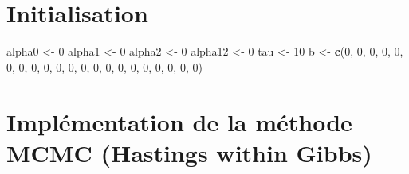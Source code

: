 \documentclass[
]{article}
\newenvironment{Shaded}{\begin{snugshade}}{\end{snugshade}}
\newcommand{\DecValTok}[1]{\textcolor[rgb]{0.00,0.00,0.81}{#1}}
\newcommand{\FunctionTok}[1]{\textcolor[rgb]{0.13,0.29,0.53}{\textbf{#1}}}
\newcommand{\NormalTok}[1]{#1}
\newcommand{\OtherTok}[1]{\textcolor[rgb]{0.56,0.35,0.01}{#1}}
\begin{document}
\hypertarget{initialisation}{%
\section{Initialisation}\label{initialisation}}

\begin{Shaded}
\begin{Highlighting}[]
\NormalTok{alpha0 }\OtherTok{\textless{}{-}} \DecValTok{0}
\NormalTok{alpha1 }\OtherTok{\textless{}{-}} \DecValTok{0}
\NormalTok{alpha2 }\OtherTok{\textless{}{-}} \DecValTok{0}
\NormalTok{alpha12 }\OtherTok{\textless{}{-}} \DecValTok{0}
\NormalTok{tau }\OtherTok{\textless{}{-}} \DecValTok{10}
\NormalTok{b }\OtherTok{\textless{}{-}} \FunctionTok{c}\NormalTok{(}\DecValTok{0}\NormalTok{, }\DecValTok{0}\NormalTok{, }\DecValTok{0}\NormalTok{, }\DecValTok{0}\NormalTok{, }\DecValTok{0}\NormalTok{, }\DecValTok{0}\NormalTok{, }\DecValTok{0}\NormalTok{, }\DecValTok{0}\NormalTok{, }\DecValTok{0}\NormalTok{, }\DecValTok{0}\NormalTok{, }\DecValTok{0}\NormalTok{, }\DecValTok{0}\NormalTok{, }\DecValTok{0}\NormalTok{, }\DecValTok{0}\NormalTok{, }\DecValTok{0}\NormalTok{, }\DecValTok{0}\NormalTok{, }\DecValTok{0}\NormalTok{, }\DecValTok{0}\NormalTok{, }\DecValTok{0}\NormalTok{, }\DecValTok{0}\NormalTok{, }\DecValTok{0}\NormalTok{)}
\end{Highlighting}
\end{Shaded}

\hypertarget{impluxe9mentation-de-la-muxe9thode-mcmc-hastings-within-gibbs}{%
\section{Implémentation de la méthode MCMC (Hastings within
Gibbs)}\label{impluxe9mentation-de-la-muxe9thode-mcmc-hastings-within-gibbs}}
\end{document}
